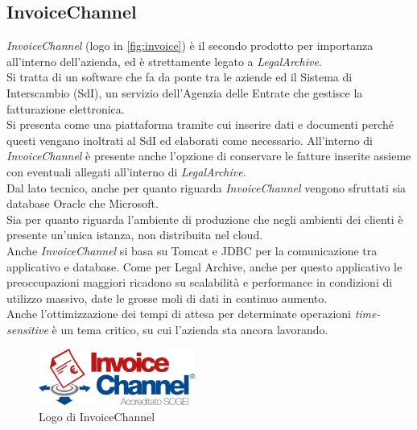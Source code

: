 \subsection{InvoiceChannel}
\textit{InvoiceChannel} (logo in \autoref{fig:invoice}) è il secondo prodotto per importanza all'interno dell'azienda, ed è strettamente legato a \textit{LegalArchive}\cite{site:invoicechannel}.\\
Si tratta di un software che fa da ponte tra le aziende ed il Sistema di Interscambio (SdI), un servizio dell'Agenzia delle Entrate che gestisce la fatturazione elettronica.\\
Si presenta come una piattaforma tramite cui inserire dati e documenti perché questi vengano inoltrati al SdI ed elaborati come necessario. All'interno di \textit{InvoiceChannel} è presente anche l'opzione di conservare le fatture inserite assieme con eventuali allegati all'interno di \textit{LegalArchive}.\\
Dal lato tecnico, anche per quanto riguarda \textit{InvoiceChannel} vengono sfruttati sia database Oracle che Microsoft.\\
Sia per quanto riguarda l'ambiente di produzione che negli ambienti dei clienti è presente un'unica istanza, non distribuita nel cloud.\\
Anche \textit{InvoiceChannel} si basa su \gls{Tomcat} e \gls{JDBC} per la comunicazione tra applicativo e database.
Come per Legal Archive, anche per questo applicativo le preoccupazioni maggiori ricadono su scalabilità e performance in condizioni di utilizzo massivo, date le grosse moli di dati in continuo aumento.\\
Anche l'ottimizzazione dei tempi di attesa per determinate operazioni \textit{time-sensitive} è un tema critico, su cui l'azienda sta ancora lavorando.\\

\begin{figure}[htbp]
\begin{center}
\includegraphics[height=5em]{immagini/tecnologies-logos/logo-invoice-channel.png}
\caption{Logo di InvoiceChannel}
\label{fig:invoice}
\end{center}
\end{figure}

